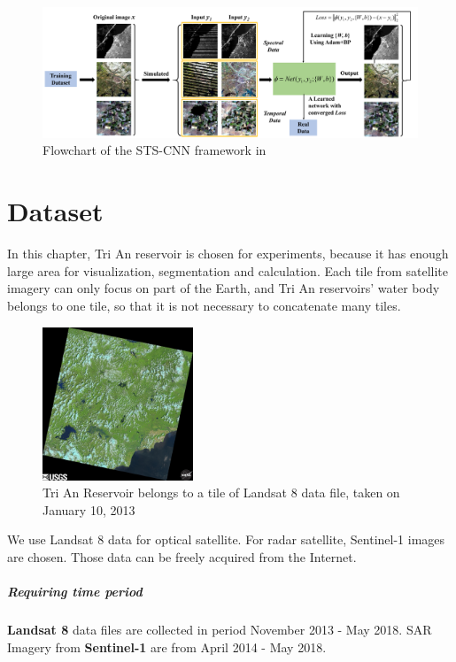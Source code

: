 \begin{figure}[h!]
	\includegraphics[width=1\textwidth]{figures/sts-cnn_framework.png}
	\caption{Flowchart of the STS-CNN framework in \cite{Zhang2018}}
\end{figure}

\section {Dataset}
In this chapter, Tri An reservoir is chosen for experiments, because it has enough large area for visualization, segmentation and calculation. Each tile from satellite imagery can only focus on part of the Earth, and Tri An reservoirs' water body belongs to one tile, so that it is not necessary to concatenate many tiles.

\begin{figure}[h!]
	\centering
	\includegraphics[width=0.4\textwidth]{figures/l8tile.png}
	\caption{Tri An Reservoir belongs to a tile of Landsat 8 data file, taken on January 10, 2013}
\end{figure}	


We use Landsat 8 data for optical satellite. For radar satellite, Sentinel-1 images are chosen. Those data can be freely acquired from the Internet.

\subparagraph{Requiring time period} \textbf{Landsat 8} data files are collected in period November 2013 - May 2018. SAR Imagery from \textbf{Sentinel-1} are from April 2014 - May 2018.


